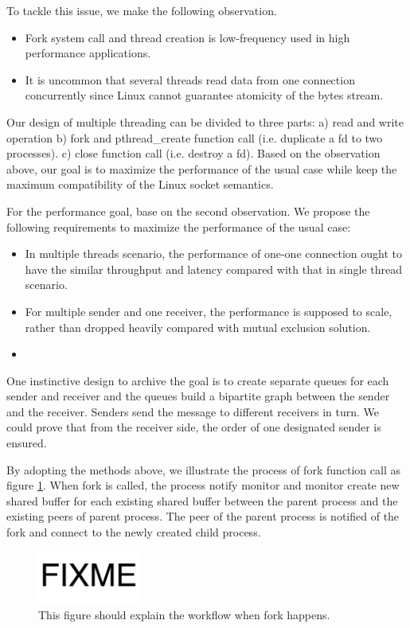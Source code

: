 To tackle this issue, we make the following observation.
\begin{itemize}
	\item Fork system call and thread creation is low-frequency used in high performance applications.
	\item It is uncommon that several threads read data from one connection concurrently since Linux cannot guarantee atomicity of the bytes stream.
\end{itemize} 

Our design of multiple threading can be divided to three parts: a) read and write operation b) fork and pthread\_create function call (i.e. duplicate a fd to two processes). c) close function call (i.e. destroy a fd). Based on the observation above, our goal is to maximize the performance of the usual case while keep the maximum compatibility of the Linux socket semantics.

For the performance goal, base on the second observation. We propose the following requirements to maximize the performance of the usual case:
\begin{itemize}
 \item In multiple threads scenario, the performance of one-one connection ought to have the similar throughput and latency compared with that in single thread scenario.
 \item For multiple sender and one receiver, the performance is supposed to scale, rather than dropped heavily compared with mutual exclusion solution.
 \item  
\end{itemize}


One instinctive design to archive the goal is to create separate queues for each sender and receiver and the queues build a bipartite graph between the sender and the receiver. Senders send the message to different receivers in turn. We could prove that from the receiver side, the order of one designated sender is ensured.

By adopting the methods above, we illustrate the process of fork function call as figure \ref{fig:fork-process}. When fork is called, the process notify monitor and monitor create new shared buffer for each existing shared buffer between the parent process and the existing peers of parent process. The peer of the parent process is notified of the fork and connect to the newly created child process.

\begin{figure}[t]
	\centering
	\includegraphics[width=0.3\textwidth]{images/fixme}
	\caption{This figure should explain the workflow when fork happens.}
	\label{fig:fork-process}
\end{figure}

